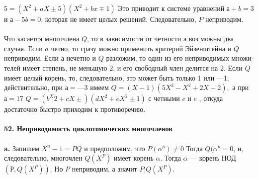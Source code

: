 $5 = (X^{2} + aX \pm 5)(X^{2} + bx \mp 1)$ Это приводит к системе уравнений \linebreak
$а + b = 3$ и $а - 5b = 0$, которая не имеет целых решений. Следовательно,\linebreak
$P$ неприводим.\\
\\
\hspace*{15pt}Что касается многочлена $Q$, то в зависимости от четности а воз­
можны два случая. Если $a$ четно, то сразу можно применить критерий
Эйзенштейна и $Q$ неприводим.
\hspace*{0pt} Если а нечетно и $Q$ разложим, то один из его неприводимых множи­\linebreak
телей имеет степень, не меньшую 2, и его свободный член делится на 2.\linebreak
Если $Q$ имеет целый корень, то, следовательно, это может быть только 1\linebreak
или —1; действительно, при $а = —3$ имеем $Q = (X - 1)(5X^3 - X^2 + 2X - 2),$\linebreak
а при $а = 17$ $Q = (b^X{2} + cX \pm)(dX^{2} + eX^{2} \pm 1)$ с четными $c$ и $e$ , откуда\linebreak
достаточно быстро приходим к противоречию.\\
\\
\noindent\textbf{52. Неприводимость циклотомических многочленов}\\
\\
\hspace*{15pt}\textbf{a.} Запишем $X^{n} - 1 = PQ $ и предположим, что $P(\alpha^p) \neq 0$ Тогда\linebreak
$Q(\alpha^{p} = 0$, и, следовательно, многочлен $Q(X^{P})$ имеет корень $\alpha$. Тогда\linebreak
$\alpha$ ---  корень НОД$(Р, Q(X^{P}))$. Но $P$ неприводим, а значит $P | Q(X^{P})$.\\

